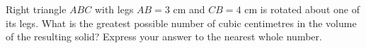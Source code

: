 Right triangle $ABC$ with legs $AB=3$ cm and $CB=4$ cm is rotated about one of its legs. What is the greatest possible number of cubic centimetres in the volume of the resulting solid? Express your answer to the nearest whole number.
